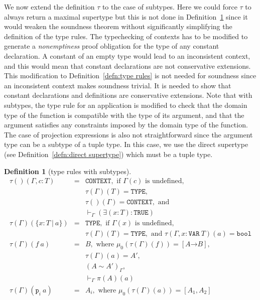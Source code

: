 \documentclass [12pt,twoside]{cslreport}
\newcommand{\thmbox}
   {{\ \hfill\hbox{%
      \vrule width1.0ex height1.0ex
   }\parfillskip 0pt }}
\newcommand{\aro}{\mathord\rightarrow} %
\newcommand{\funtype}[2]{[#1 \aro #2]}
\newcommand{\tupletype}[1]{[#1]}
\newcommand{\tauGamma}[1]{\tau(\Gamma)(#1)}
\newcommand{\proj}[1]{\mathtt{p}_{#1}}
\newcommand{\ttbool}{\mathtt{bool}}
\newcommand{\tttrue}{\mathtt{TRUE}}
\newcommand{\tttype}{\mathtt{TYPE}}
\newcommand{\ttcontext}{\mathtt{CONTEXT}}
\newcommand{\ttvar}{\mathtt{VAR}}
\newcommand{\vbar}{\ |\ }
\newtheorem{definition}{Definition}
\newenvironment{Defn}[1]{\begin{definition}[#1]\label{defn:#1}}{
\thmbox\end{definition}}
\begin{document}
We now extend the definition $\tau$ to the case of subtypes.  Here we
could force $\tau$ to always return a maximal supertype but this is not
done in Definition~\ref{defn:type rules with subtypes}  since it
would weaken the soundness theorem without significantly simplifying the
definition of the type rules.  The typechecking of contexts has to be
modified to generate a {\em nonemptiness\/} proof obligation for the type of
any constant declaration.  A constant of an empty type would lead to an
inconsistent context, and this would mean that constant declarations are
not conservative extensions.  This modification to
Definition~\ref{defn:type rules} is not needed for soundness since an
inconsistent context makes soundness trivial.  It is needed to show that
constant declarations and definitions are conservative extensions.  Note
that with subtypes, the type rule for an application is modified to check
that the domain type of the function is compatible with the type of its
argument, and that the argument satisfies any constraints imposed by the
domain type of the function.  The case of projection expressions is also
not straightforward since the argument type can be a subtype of a tuple
type.  In this case, we use the direct supertype (see
Definition~\ref{defn:direct supertype}) which must be a tuple type.
%
\begin{Defn}{type rules with subtypes}
\begin{eqnarray*}
  \tau()(\Gamma, c : T) & = & \ttcontext, \mbox{ if } \Gamma(c)
\mbox{ is undefined},\\& &
\tauGamma{T} =   \tttype{},\\& &
      \tau()(\Gamma) = \ttcontext,  \mbox{ and } \\& & 
   \vdash_\Gamma (\exists (x: T) : \tttrue)\\
%
  \tauGamma{\{x : T \vbar a\}} & = & \tttype{}, \mbox{ if } \Gamma(x)
\mbox{ is undefined}, \\& & 
    \tauGamma{T} = \tttype{}, \mbox{ and } \tau(\Gamma, x : \ttvar{}\ T)(a) = \ttbool \\
%
  \tauGamma{f\ a} & = &  B, \mbox{ where } \mu_0(\tauGamma{f}) =
                                                 \funtype{A}{B},\\&  & 
                   			\tauGamma{a} = A',\\ & &
					(A \sim A')_\Gamma,\\& & 
                                        \vdash_\Gamma \pi(A)(a) \\
 \tauGamma{\proj{i}~a} & = & A_i, \mbox{ where } \mu_0(\tauGamma{a}) =
\tupletype{A_1, A_2}
\end{eqnarray*}
\end{Defn}
\end{document}
